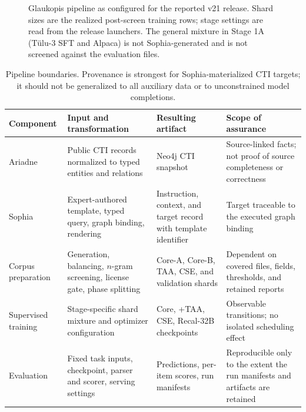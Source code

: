 \documentclass[preprint,12pt,authoryear]{elsarticle}
\begin{document}
\begin{figure}[!htbp]
{}
\caption{Glaukopis pipeline as configured for the reported v21 release. Shard sizes are the realized post-screen training rows; stage settings are read from the release launchers. The general mixture in Stage 1A (T\"ulu-3 SFT and Alpaca) is not Sophia-generated and is not screened against the evaluation files.}\label{fig:pipeline}
\end{figure}

\begin{table}[!htbp]
\centering\footnotesize
\caption{Pipeline boundaries. Provenance is strongest for Sophia-materialized CTI targets; it should not be generalized to all auxiliary data or to unconstrained model completions.}\label{tab:boundaries}
\begin{tabularx}{\textwidth}{@{}p{2.4cm}XXX@{}}
\toprule Component & Input and transformation & Resulting artifact & Scope of assurance \\\midrule
Ariadne & Public CTI records normalized to typed entities and relations & Neo4j CTI snapshot & Source-linked facts; not proof of source completeness or correctness \\
Sophia & Expert-authored template, typed query, graph binding, rendering & Instruction, context, and target record with template identifier & Target traceable to the executed graph binding \\
Corpus preparation & Generation, balancing, $n$-gram screening, license gate, phase splitting & Core-A, Core-B, TAA, CSE, and validation shards & Dependent on covered files, fields, thresholds, and retained reports \\
Supervised training & Stage-specific shard mixture and optimizer configuration & Core, +TAA, CSE, Recal-32B checkpoints & Observable transitions; no isolated scheduling effect \\
Evaluation & Fixed task inputs, checkpoint, parser and scorer, serving settings & Predictions, per-item scores, run manifests & Reproducible only to the extent the run manifests and artifacts are retained \\\bottomrule
\end{tabularx}
\end{table}
\end{document}
